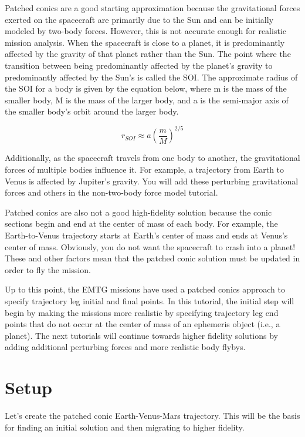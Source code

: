 \documentclass[11pt]{article}
\begin{document}
\noindent Patched conics are a good starting approximation because the gravitational forces exerted on the spacecraft are primarily due to the Sun and can be initially modeled by two-body forces. However, this is not accurate enough for realistic mission analysis. When the spacecraft is close to a planet, it is predominantly affected by the gravity of that planet rather than the Sun. The point where the transition between being predominantly affected by the planet’s gravity to predominantly affected by the Sun’s is called the \ac{SOI}. The approximate radius of the \ac{SOI} for a body is given by the equation below, where m is the mass of the smaller body, M is the mass of the larger body, and a is the semi-major axis of the smaller body’s orbit around the larger body.

\[ r_{SOI} \approx a(\frac{m}{M})^{2/5} \]

\noindent Additionally, as the spacecraft travels from one body to another, the gravitational forces of multiple bodies influence it. For example, a trajectory from Earth to Venus is affected by Jupiter’s gravity. You will add these perturbing gravitational forces and others in the non-two-body force model tutorial. 

\noindent Patched conics are also not a good high-fidelity solution because the conic sections begin and end at the center of mass of each body. For example, the Earth-to-Venus trajectory starts at Earth’s center of mass and ends at Venus’s center of mass. Obviously, you do not want the spacecraft to crash into a planet! These and other factors mean that the patched conic solution must be updated in order to fly the mission.

\noindent Up to this point, the \ac{EMTG} missions have used a patched conics approach to specify trajectory leg initial and final points. In this tutorial, the initial step will begin by making the missions more realistic by specifying trajectory leg end points that do not occur at the center of mass of an ephemeris object (i.e., a planet). The next tutorials will continue towards higher fidelity solutions by adding additional perturbing forces and more realistic body flybys.


\section{Setup}
\label{sec:setup}

Let’s create the patched conic Earth-Venus-Mars trajectory. This will be the basis for finding an initial solution and then migrating to higher fidelity.
\end{document}
